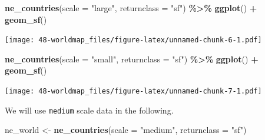 \documentclass[
  xelatex, ja=standard]{bxjsbook}
\newenvironment{Shaded}{\begin{snugshade}}{\end{snugshade}}
\newcommand{\AttributeTok}[1]{\textcolor[rgb]{0.13,0.29,0.53}{#1}}
\newcommand{\FunctionTok}[1]{\textcolor[rgb]{0.13,0.29,0.53}{\textbf{#1}}}
\newcommand{\NormalTok}[1]{#1}
\newcommand{\OtherTok}[1]{\textcolor[rgb]{0.56,0.35,0.01}{#1}}
\newcommand{\SpecialCharTok}[1]{\textcolor[rgb]{0.81,0.36,0.00}{\textbf{#1}}}
\newcommand{\StringTok}[1]{\textcolor[rgb]{0.31,0.60,0.02}{#1}}
\theoremstyle{definition}
\theoremstyle{definition}
\theoremstyle{definition}
\theoremstyle{definition}
\theoremstyle{remark}
\begin{document}
\begin{Shaded}
\begin{Highlighting}[]
\FunctionTok{ne\_countries}\NormalTok{(}\AttributeTok{scale =} \StringTok{"large"}\NormalTok{, }\AttributeTok{returnclass =} \StringTok{"sf"}\NormalTok{) }\SpecialCharTok{\%\textgreater{}\%}
  \FunctionTok{ggplot}\NormalTok{() }\SpecialCharTok{+}   \FunctionTok{geom\_sf}\NormalTok{()}
\end{Highlighting}
\end{Shaded}

\texttt{[image: 48-worldmap\_files/figure-latex/unnamed-chunk-6-1.pdf]}

\begin{Shaded}
\begin{Highlighting}[]
\FunctionTok{ne\_countries}\NormalTok{(}\AttributeTok{scale =} \StringTok{"small"}\NormalTok{, }\AttributeTok{returnclass =} \StringTok{"sf"}\NormalTok{) }\SpecialCharTok{\%\textgreater{}\%}
  \FunctionTok{ggplot}\NormalTok{() }\SpecialCharTok{+}   \FunctionTok{geom\_sf}\NormalTok{()}
\end{Highlighting}
\end{Shaded}

\texttt{[image: 48-worldmap\_files/figure-latex/unnamed-chunk-7-1.pdf]}

We will use \texttt{medium} scale data in the following.

\begin{Shaded}
\begin{Highlighting}[]
\NormalTok{ne\_world }\OtherTok{\textless{}{-}} \FunctionTok{ne\_countries}\NormalTok{(}\AttributeTok{scale =} \StringTok{"medium"}\NormalTok{, }\AttributeTok{returnclass =} \StringTok{"sf"}\NormalTok{)}
\end{Highlighting}
\end{Shaded}
\end{document}
